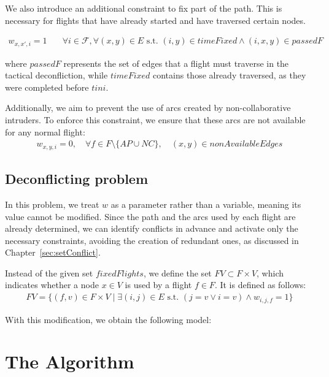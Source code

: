 \documentclass[../thesis.tex]{subfiles}
\begin{document}
We also introduce an additional constraint to fix part of the path.  
This is necessary for flights that have already started and have traversed certain nodes.

\begin{align}
    w_{x,x',i} = 1 & \quad \forall i \in \mathcal{F}, \forall (x,y) \in E \text{ s.t. } (i,y) \in timeFixed \land (i,x,y) \in passedF
\end{align}

where $passedF$ represents the set of edges that a flight must traverse in the tactical deconfliction, while $timeFixed$ contains those already traversed, as they were completed before $tini$.

Additionally, we aim to prevent the use of arcs created by non-collaborative intruders.  
To enforce this constraint, we ensure that these arcs are not available for any normal flight:  
\begin{align}
    w_{x,y,i} = 0, \quad \forall f \in F \setminus \{AP \cup NC\}, \quad (x,y) \in nonAvailableEdges
\end{align}


\subsection{Deconflicting problem}\label{ssec:deconflictingHeur}
In this problem, we treat $w$ as a parameter rather than a variable, meaning its value cannot be modified.
Since the path and the arcs used by each flight are already determined, we can identify conflicts in advance and activate only the necessary constraints, avoiding the creation of redundant ones, as discussed in Chapter~\ref{sec:setConflict}.

Instead of the given set $fixedFlights$, we define the set $FV \subset F \times V$, which indicates whether a node $x \in V$ is used by a flight $f \in F$. It is defined as follows:
\begin{align}\label{eq:set:FV}
    FV = \{(f,v) \in F \times V \mid \exists (i,j) \in E \text{ s.t. } (j = v \lor i = v) \land w_{i,j,f} = 1\}
\end{align}

With this modification, we obtain the following model:



\section{The Algorithm}\label{sec:alg:mathEuristicDescription}
\end{document}
